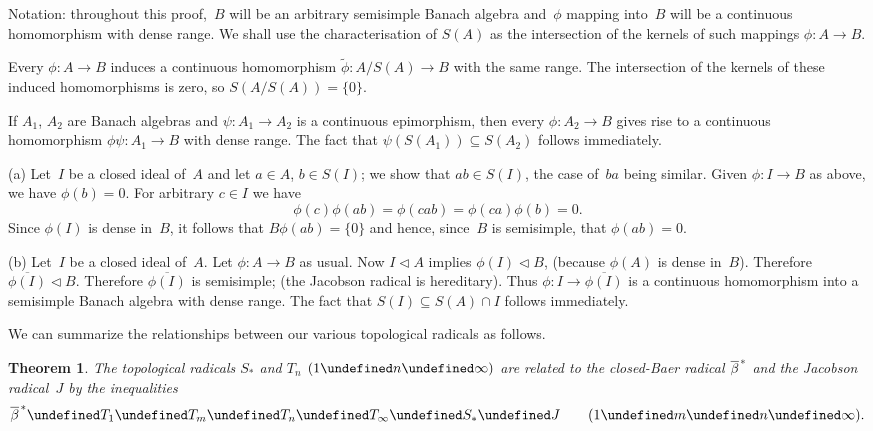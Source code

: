 \documentclass[11pt]{article}
\newcounter{arbenum}
\newenvironment{arbenumerate}{\begin{list}{{\rm(\arabic{arbenum})}}%
{\usecounter{arbenum}}}{\end{list}}
\newcommand{\sseq}{\subseteq}
\let\leq\undefined  \let\geq\undefined
\let\le\leq   \let\ge\geq
\newcommand{\closure}[1]{\overline{#1}}
\newcommand{\idealin}{\lhd}
\newtheorem{thm}{Theorem}[section]
\newenvironment{Proof}{{\it Proof. }}{}%
\newcommand{\barstar}[1]{{\closure{#1}\kern 1pt}^*}
\begin{document}
\begin{Proof}
Notation: throughout this proof,~$B$ will be an arbitrary semisimple Banach
algebra and~$\phi$ mapping into~$B$ will be a continuous homomorphism with dense
range.   We shall use the characterisation of $S(A)$ as the intersection of the
kernels of such mappings $\phi:A \to B$.
\begin{arbenumerate}
\addtocounter{arbenum}{1}
\item
Every $\phi:A\to B$ induces a continuous homomorphism $\tilde\phi:A/S(A)\to B$
with the same range.   The intersection of the kernels of these induced
homomorphisms is zero, so $S(A/S(A)) = \{0\}$.
\item
If $A_1$, $A_2$ are Banach algebras and $\psi:A_1\to A_2$ is a continuous
epimorphism, then every $\phi:A_2\to B$ gives rise to a continuous
homomorphism $\phi\psi:A_1\to B$ with dense range.  The fact that
$\psi(S(A_1)) \sseq S(A_2)$ follows immediately.
\item(a)
Let~$I$ be a closed ideal of~$A$ and let $a \in A$, $b \in S(I)$; we show that
$ab \in S(I)$, the case of~$ba$ being similar.  Given $\phi:I \to B$ as above,
we have $\phi(b) = 0$.   For arbitrary $c \in I$ we have
$$\phi(c)\phi(ab) = \phi(cab) = \phi(ca)\phi(b) = 0.$$
Since $\phi(I)$ is dense in~$B$, it follows that $B\phi(ab) = \{0\}$ and
hence, since~$B$ is semisimple, that $\phi(ab) = 0$.
\addtocounter{arbenum}{-1}
\item(b)
Let~$I$ be a closed ideal of~$A$.   Let $\phi:A\to B$ as usual.  Now $I \idealin
A$ implies $\phi(I) \idealin B$, (because $\phi(A)$ is dense in~$B$).  Therefore
$\closure{\phi(I)} \idealin B$.    Therefore $\closure{\phi(I)}$ is semisimple; (the
Jacobson radical is hereditary).  Thus $\phi:I \to \closure{\phi(I)}$ is a
continuous homomorphism into a semisimple Banach algebra with dense range.
The fact that $S(I) \sseq S(A) \cap I$ follows immediately.
\end{arbenumerate}

\end{Proof}


We can summarize the relationships between our various topological radicals as
follows.

\begin{thm}\label{T12}
The topological radicals $S_*$ and $T_n$ $(1 \le n \le \infty)$
are related to the closed-Baer radical $\barstar\beta$  and the Jacobson
radical~$J$ by the inequalities
$$\barstar\beta \le T_1 \le T_m \le T_n \le T_\infty \le S_* \le J
                                       \qquad (1 \le m \le n \le \infty).$$
\end{thm}
\end{document}
